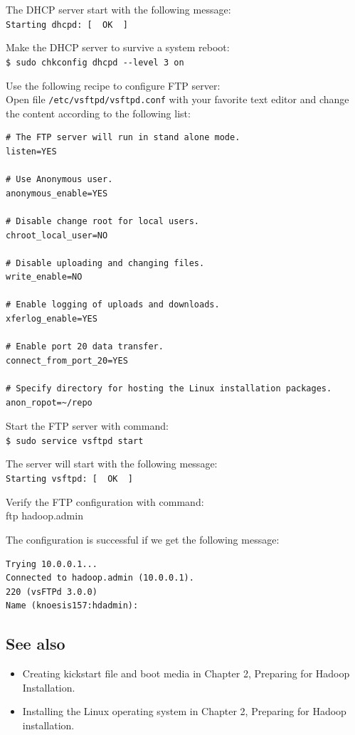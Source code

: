 The DHCP server start with the following message: \\
\verb|Starting dhcpd: [  OK  ]|

Make the DHCP server to survive a system reboot: \\
\verb|$ sudo chkconfig dhcpd --level 3 on|

Use the following recipe to configure FTP server: \\

Open file \verb|/etc/vsftpd/vsftpd.conf| with your favorite text editor and change the content according to the following list:
\lstset{style=bashstyle}
\begin{lstlisting}
# The FTP server will run in stand alone mode.
listen=YES

# Use Anonymous user.
anonymous_enable=YES

# Disable change root for local users.
chroot_local_user=NO

# Disable uploading and changing files.
write_enable=NO

# Enable logging of uploads and downloads.
xferlog_enable=YES

# Enable port 20 data transfer.
connect_from_port_20=YES

# Specify directory for hosting the Linux installation packages.
anon_ropot=~/repo
\end{lstlisting}

Start the FTP server with command: \\
\verb|$ sudo service vsftpd start|

The server will start with the following message: \\
\verb|Starting vsftpd: [  OK  ]|

Verify the FTP configuration with command: \\
ftp hadoop.admin

The configuration is successful if we get the following message:
\lstset{style=bashstyle}
\begin{lstlisting}
Trying 10.0.0.1...
Connected to hadoop.admin (10.0.0.1).
220 (vsFTPd 3.0.0)
Name (knoesis157:hdadmin):
\end{lstlisting}

\subsection*{See also}
\begin{itemize}
  \item Creating kickstart file and boot media in Chapter 2, Preparing for Hadoop Installation.
  \item Installing the Linux operating system in Chapter 2, Preparing for Hadoop installation.
\end{itemize}

